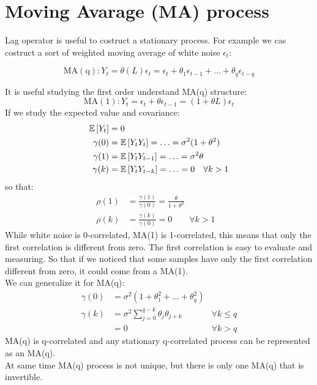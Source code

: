 \section{Moving Avarage (MA) process}
Lag operator is useful to costruct a stationary process. For example we cas costruct a sort of weighted moving average of white noise $\epsilon_t$: 
\begin{mydefinition}[MA(q)]
\begin{equation}
	\mathrm{MA(q)}: Y_t = \theta(L)\epsilon_t = \epsilon_t + \theta_1\epsilon_{t-1} + \ldots + \theta_q\epsilon_{t-q}
	\label{MA}
\end{equation}
\end{mydefinition}
It is useful studying the first order understand MA(q) structure:
\[
\mathrm{MA(1)}: Y_t = \epsilon_t + \theta \epsilon_{t-1} = (1 + \theta L)\epsilon_t
\]
If we study the expected value and covariance:
\begin{align*}
	\mathbb{E}\left[Y_t\right] &= 0 \\
	\gamma(0) &= \mathbb{E}\left[Y_tY_t\right] = \ldots = \sigma^2(1 + \theta^2)\\
	\gamma(1) & = \mathbb{E}\left[Y_tY_{t-1}\right] = \ldots = \sigma^2 \theta\\
	\gamma(k) & = \mathbb{E}\left[Y_tY_{t-k}\right] = \ldots = 0\quad \forall k>1
\end{align*}
so that:
\begin{align}
	\rho(1) &= \frac{\gamma(1)}{\gamma(0)} = \frac{\theta}{1 + \theta^2}&\\
	\rho(k) &= \frac{\gamma(k)}{\gamma(0)} = 0 \qquad  \forall k>1
\end{align}
While white noise is 0-correlated, MA(1) is 1-correlated, this means that only the first correlation is different from zero. The first correlation is easy to evaluate and measuring. So that if we noticed that some samples have only the first correlation different from zero, it could come from a MA(1).\\
We can generalize it for MA(q):
\begin{align}
	\gamma(0) & =\sigma^2(1 + \theta_1^2 + \ldots + \theta^2_q)&\\
	\gamma(k) & = \sigma^2\sum_{j=0}^{q-k} \theta_j\theta_{j+k} & \forall k \leq q\\
	& = 0 & \forall k > q
\end{align}
MA(q) is q-correlated and any stationary q-correlated process can be represented as an MA(q).\\
At same time MA(q) process is not unique, but there is only one MA(q) that is invertible.\\
